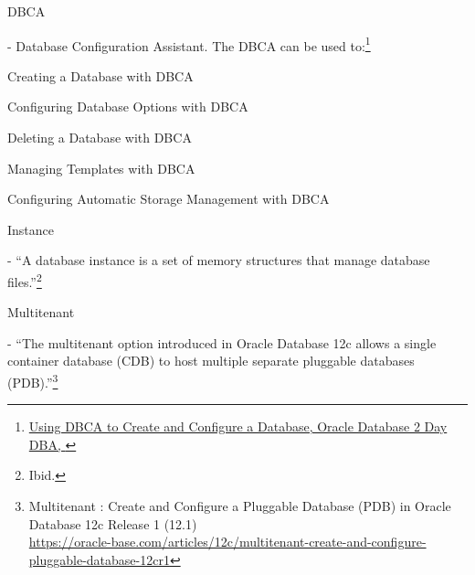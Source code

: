 \begin{itemize*}
\item{\begin{bf}DBCA\end{bf}} - Database Configuration Assistant.  The DBCA can be used to:\footnote{\href{https://docs.oracle.com/cd/B16254_01/doc/server.102/b14196/install003.htm}{Using DBCA to Create and Configure a Database, Oracle\textregistered \hspace{1pt} Database 2 Day DBA, }}
\begin{itemize*}
  \item Creating a Database with DBCA
  \item Configuring Database Options with DBCA
  \item Deleting a Database with DBCA
  \item Managing Templates with DBCA
  \item Configuring Automatic Storage Management with DBCA
\end{itemize*}


\item{\begin{bf}Instance\end{bf}} - ``A database instance
  is a set of memory structures that manage database files.''\footnote{Ibid.}
  

\item{\begin{bf}Multitenant\end{bf}} - ``The multitenant option
  introduced in Oracle Database 12c allows a single container
  database (CDB) to host multiple separate pluggable databases
  (PDB).''\footnote{Multitenant : Create and Configure a Pluggable Database (PDB) in Oracle Database 12c Release 1 (12.1)\\
\href{https://oracle-base.com/articles/12c/multitenant-create-and-configure-pluggable-database-12cr1}{https://oracle-base.com/articles/12c/multitenant-create-and-configure-pluggable-database-12cr1}}


\end{itemize*}
